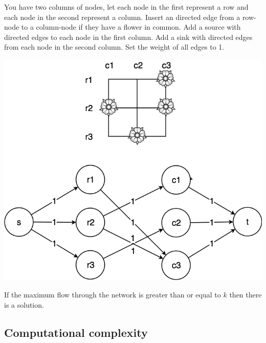 \documentclass[a4paper]{article}
\newenvironment{task}[1]
{
	\begin{description}[align=right]
		\item [#1]
}{		%
	\end{description}
}
\DeclareMathOperator{\*}{\cdot}
\begin{document}
\begin{task}{(d)}
	\qquad You have two columns of nodes, let each node in the first represent a row and each node in the second represent a column. Insert an directed edge from a row-node to a column-node if they have a flower in common. Add a source with directed edges to each node in the first column. Add a sink with directed edges from each node in the second column. Set the weight of all edges to 1.
	
	\includegraphics[scale=0.3]{100528-8d.png}
	
	If the maximum flow through the network is greater than or equal to $k$ then there is a solution.
\end{task}

\subsection*{Computational complexity}

\begin{task}{9. (a)}
\end{task}

\begin{task}{(b)}
\end{task}

\begin{task}{(c)}
\end{task}

\begin{task}{(d)}
\end{task}
\end{document}
